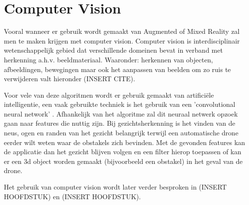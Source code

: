 \section{Computer Vision}

Vooral wanneer er gebruik wordt gemaakt van Augmented of Mixed Reality zal men te maken krijgen met computer vision. Computer vision is interdisciplinair wetenschappelijk gebied dat verschillende domeinen bevat in verband met herkenning a.h.v. beeldmateriaal. Waaronder: herkennen van objecten, afbeeldingen, bewegingen maar ook het aanpassen van beelden om zo ruis te verwijderen valt hieronder (INSERT CITE).

Voor vele van deze algoritmen wordt er gebruik gemaakt van artificiële intelligentie, een vaak gebruikte techniek is het gebruik van een 'convolutional neural network' \autocite{Ji2010}. Afhankelijk van het algoritme zal dit neuraal netwerk opzoek gaan naar features die nuttig zijn. Bij gezichtsherkenning is het vinden van de neus, ogen en randen van het gezicht belangrijk terwijl een automatische drone eerder wilt weten waar de obstakels zich bevinden. Met de gevonden features kan de applicatie dan het gezicht blijven volgen en een filter hierop toepassen of kan er een 3d object worden gemaakt (bijvoorbeeld een obstakel) in het geval van de drone. 

Het gebruik van computer vision wordt later verder besproken in (INSERT HOOFDSTUK) en (INSERT HOOFDSTUK). %
